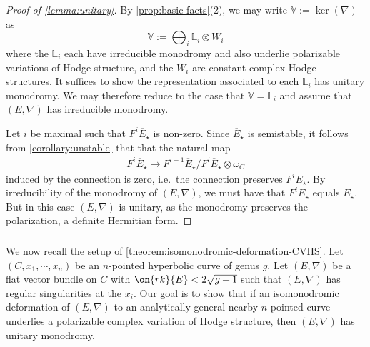 \documentclass[12 pt]{amsart}
\theoremstyle{plain}
\theoremstyle{definition}
\theoremstyle{remark}
\numberwithin{equation}{section}
\begin{document}
\begin{proof}[Proof of \autoref{lemma:unitary}]
	By \autoref{prop:basic-facts}(2), we may write
	$\mathbb{V}:=\ker(\nabla)$ as $$\mathbb{V}:=\bigoplus_i
	\mathbb{L}_i\otimes W_i$$ where the $\mathbb{L}_i$ each have irreducible
	monodromy and also underlie polarizable variations of Hodge structure,
	and the $W_i$ are constant complex Hodge structures.
	It suffices to show the representation associated to each $\mathbb L_i$ has unitary monodromy.
	We may therefore reduce to the case that $\mathbb{V} = \mathbb L_i$ and assume
	that $(E,\nabla)$ has irreducible monodromy.


Let $i$ be maximal such that $F^i\overline{E}_\star$ is non-zero. 
Since $\overline{E}_\star$ is semistable, it follows from
\autoref{corollary:unstable} that
that the natural map 
\begin{align*}
	F^i\overline{E}_\star \to
	F^{i-1}\overline{E}_\star/F^i\overline{E}_\star\otimes \omega_C
\end{align*}
induced by the connection is zero, i.e.~the connection preserves
$F^i\overline{E}_\star$. By irreducibility
of the monodromy of $(E, \nabla)$, we must have that $F^i\overline{E}_\star$ equals
$\overline{E}_\star.$
But in this case $({E}, \nabla)$ is unitary, as the monodromy preserves the polarization, a definite Hermitian form.
\end{proof}


\subsubsection{}
We now recall  the setup of
\autoref{theorem:isomonodromic-deformation-CVHS}. Let
$(C, x_1, \cdots, x_n)$ 
be an $n$-pointed
hyperbolic curve 
of genus $g$.
Let $({E}, \nabla)$ be a flat vector bundle on
$C$ with $\on{rk}{E}<2\sqrt{g+1}$ such that $(E,\nabla)$ has regular singularities at the $x_i$. Our goal is to show that if an isomonodromic
deformation of ${(E, \nabla)}$ to an analytically general nearby $n$-pointed curve underlies a polarizable complex variation of Hodge structure, then $({E},\nabla)$ has unitary monodromy.
\end{document}

